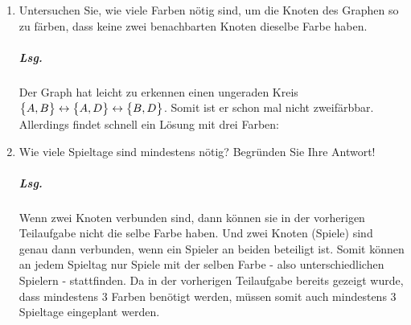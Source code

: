 \documentclass{scrreprt}
\begin{document}
\begin{enumerate}[(a)]
\begin{enumerate}[(1)]

  \newpage
  \item Untersuchen Sie, wie viele Farben nötig sind, um die Knoten des Graphen
    so zu färben, dass keine zwei benachbarten Knoten dieselbe Farbe haben.

    \subparagraph{Lsg.} Der Graph hat leicht zu erkennen einen ungeraden Kreis
    $\qty\big{A, B} \leftrightarrow \qty\big{A, D} \leftrightarrow \qty\big{B, D}$.
    Somit ist er schon mal nicht zweifärbbar.
    Allerdings findet schnell ein Lösung mit drei Farben:


  \item Wie viele Spieltage sind mindestens nötig?
    Begründen Sie Ihre Antwort!

    \subparagraph{Lsg.}  Wenn zwei Knoten verbunden sind, dann können sie in
    der vorherigen Teilaufgabe nicht die selbe Farbe haben.
    Und zwei Knoten (Spiele) sind genau dann verbunden, wenn ein Spieler an
    beiden beteiligt ist.
    Somit können an jedem Spieltag nur Spiele mit der selben Farbe - also
    unterschiedlichen Spielern - stattfinden.
    Da in der vorherigen Teilaufgabe bereits gezeigt wurde, dass mindestens 3
    Farben benötigt werden, müssen somit auch mindestens 3 Spieltage eingeplant
    werden.
  \end{enumerate}
\end{enumerate}
\end{document}
